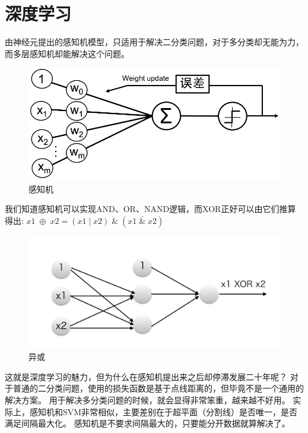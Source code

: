 \chapter{深度学习}
\label{chap:deeplearning}

由神经元提出的感知机模型，只适用于解决二分类问题，对于多分类却无能为力，
而多层感知机却能解决这个问题。

\begin{figure}[!htb]
	\centerline{\includegraphics[width=.25\figwidth]{images/perceptron.png}}
	\label{fig:part2_perceptron}
	\caption{感知机}
\end{figure}

\noindent
我们知道感知机可以实现AND、OR、NAND逻辑，而XOR正好可以由它们推算得出:
$x1\;\oplus\;x2 = (x1\;|\;x2)\;\&\;(x1\;\bar{\&}\;x2)$

\begin{figure}[!htb]
	\centerline{\includegraphics[width=.25\figwidth]{images/xor.png}}
	\label{fig:part2_xor}
	\caption{异或}
\end{figure}

\noindent
这就是深度学习的魅力，但为什么在感知机提出来之后却停滞发展二十年呢？
对于普通的二分类问题，使用的损失函数是基于点线距离的，但毕竟不是一个通用的解决方案。
用于解决多分类问题的时候，就会显得非常笨重，越来越不好用。
实际上，感知机和SVM非常相似，主要差别在于超平面（分割线）是否唯一，是否满足间隔最大化。
感知机是不要求间隔最大的，只要能分开数据就算解决了。

